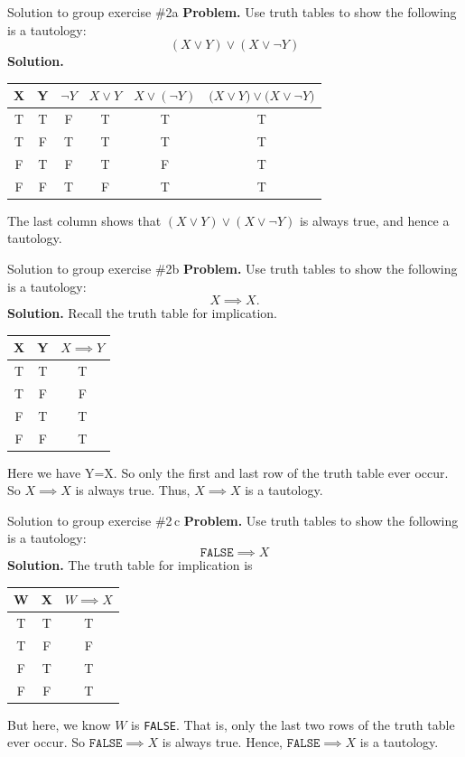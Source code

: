 \documentclass[10pt]{beamer}
\begin{document}
\begin{frame}{Solution to group exercise \#2a}
\textbf{Problem.} Use truth tables to show the following is a  tautology:
\[ (X \lor Y) \lor (X \lor \lnot Y) \]
\vfill 
\textbf{Solution.}
\begin{center}
\begin{tabular}{ccc|cc|c}
X & Y & $\lnot Y$ & $X \lor Y$ & $ X \lor (\lnot Y)$  & $ \big(X \lor Y\big) \lor \big(X \lor \lnot Y \big)$    \\
\hline 
T & T & F & T & T & T \\
T & F & T &T & T & T \\
F & T & F  &T &F & T \\
F & F & T  &F  &T & T \\
\end{tabular}
\end{center}

The last column shows that $ (X \lor Y) \lor (X \lor \lnot Y)$ is always true, and hence a tautology. 
\end{frame}


\begin{frame}{Solution to group exercise \#2b}
\textbf{Problem.} Use truth tables to show the following is a tautology:
\[X \implies X.\]
\vfill 
\textbf{Solution.}
Recall the truth table for implication. 
\begin{center}
\begin{tabular}{ccc}
X & Y & $X \implies Y$   \\
\hline 
T & T & T \\
T & F & F\\
F & T & T  \\
F & F & T  \\
\end{tabular}
\end{center}

Here we have Y=X.  So only the first and last row of the truth table ever occur.  So  $X \implies X$ is always true.  Thus,  $X \implies X$ is a tautology.
\end{frame}


\begin{frame}{Solution to group exercise \#2\,c}
\textbf{Problem.} Use truth tables to show the following is a tautology:
\[ \texttt{FALSE} \implies X\]
\vfill 
\textbf{Solution.}
The truth table for implication is
\begin{center}
\begin{tabular}{ccc}
W & X & $W \implies X$   \\
\hline 
T & T & T \\
T & F & F\\
F & T & T  \\
F & F & T  \\
\end{tabular}
\end{center}

But here, we know $W$ is \texttt{FALSE}.  That is, only the last two rows of the truth table ever occur.  So  $\texttt{FALSE} \implies X$ is always true.  Hence,  $\texttt{FALSE} \implies X$ is a tautology. 
\end{frame}
\end{document}
